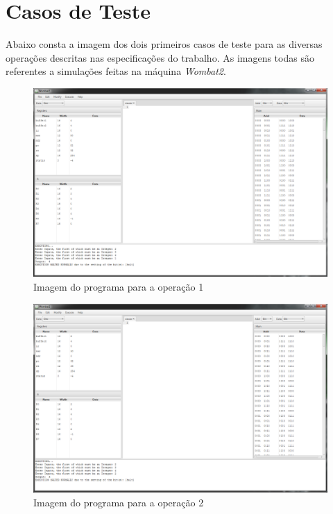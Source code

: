 \documentclass{article}
\begin{document}
\section{Casos de Teste}

Abaixo consta a imagem dos dois primeiros casos de teste para as diversas operações descritas nas especificações do trabalho. As imagens todas são referentes a simulações feitas na máquina \textit{Wombat2}.

\begin{figure}[h!]
\centering
\includegraphics[scale=0.32]{1.png}
\caption{Imagem do programa para a operação 1}
\label{fig:ibagem1}
\end{figure}


\begin{figure}[h!]
\centering
\includegraphics[scale=0.32]{2.png}
\caption{Imagem do programa para a operação 2}
\label{fig:ibagem2}
\end{figure}
\end{document}
